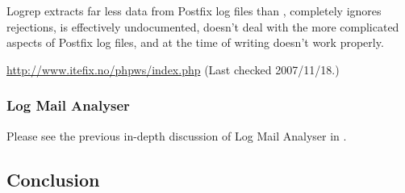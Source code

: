 Logrep extracts far less data from Postfix log files than \parsername{},
completely ignores rejections, is effectively undocumented, doesn't deal
with the more complicated aspects of Postfix log files, and at the time of
writing doesn't work properly.

\url{http://www.itefix.no/phpws/index.php} \newline (Last checked
2007/11/18.)

\subsubsection{Log Mail Analyser}

Please see the previous in-depth discussion of Log Mail Analyser in
.


\subsection{Conclusion}

